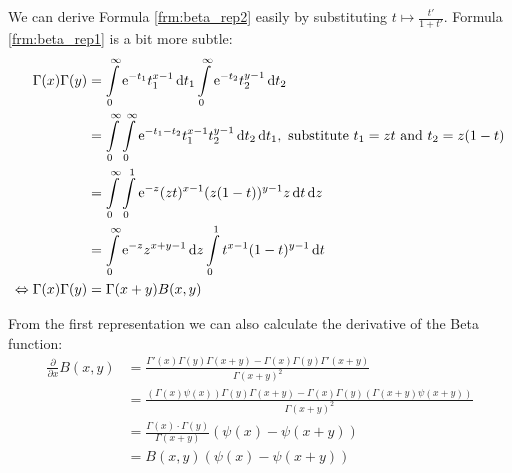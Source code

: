 We can derive Formula \ref{frm:beta_rep2} easily by substituting $t \mapsto
\frac{t'}{1+t'}$. Formula \ref{frm:beta_rep1} is a bit more subtle:
\begin{align*}
    \Gamma(x) \Gamma(y) &= \Integ[\infty]{0}{t_1}{\Eto{-t_1}t_1^{x-1}}
                           \Integ[\infty]{0}{t_2}{\Eto{-t_2}t_2^{y-1}} \\
    &= \Integ[\infty]{0}{t_1}{
        \Integ[\infty]{0}{t_2}{
            \Eto{-t_1-t_2}t_1^{x-1}t_2^{y-1}
            }
        },\text{ substitute $t_1 = zt$ and $t_2 = z(1-t)$} \\
    &= \Integ[\infty]{0}{z}{
        \Integ[1]{0}{t}{
            \Eto{-z}(zt)^{x-1}(z(1-t))^{y-1}z
            }
        } \\
        &= \Integ[\infty]{0}{z}{
            \Eto{-z}z^{x+y-1}
            }
            \Integ[1]{0}{t}{t^{x-1}(1-t)^{y-1}} \\
    \Leftrightarrow \Gamma(x)\Gamma(y) &= \Gamma(x+y)B(x,y)
\end{align*}

From the first representation we can also calculate the derivative of the Beta
function:
\begin{align}
    \frac{\partial}{\partial x} B(x, y)
    &= \frac{
                \Gamma'(x)\Gamma(y)\Gamma(x+y) - \Gamma(x)\Gamma(y)\Gamma'(x+y) 
            }{
                \Gamma(x+y)^2
            } \nonumber \\
    &= \frac{
                (\Gamma(x)\psi(x))\Gamma(y)\Gamma(x+y) -
                \Gamma(x)\Gamma(y)(\Gamma(x+y)\psi(x+y))
            }{
                \Gamma(x+y)^2
            } \nonumber \\
    &= \frac{\Gamma(x)\cdot\Gamma(y)}{\Gamma(x+y)}\left(\psi(x) - \psi(x+y)\right)
        \nonumber \\
    &= B(x,y)\left(\psi(x) - \psi(x+y)\right)
    \label{frm:beta_deriv}
\end{align}
